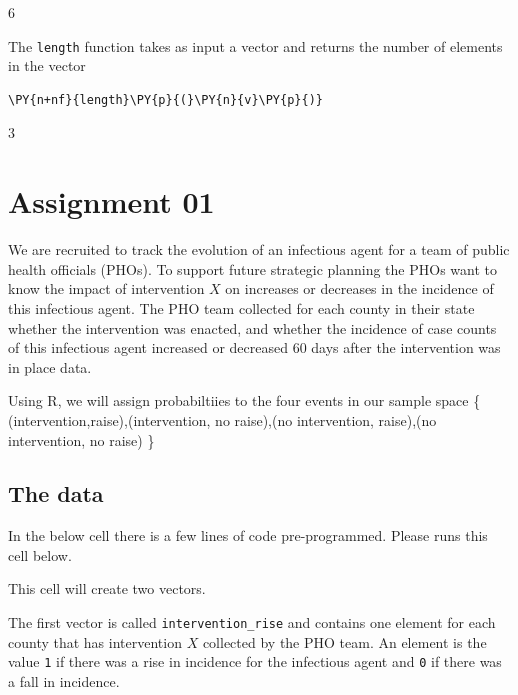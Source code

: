     6

    
    The \texttt{length} function takes as input a vector and returns the
number of elements in the vector

    \begin{tcolorbox}[breakable, size=fbox, boxrule=1pt, pad at break*=1mm,colback=cellbackground, colframe=cellborder]
\begin{Verbatim}[commandchars=\\\{\}]
\PY{n+nf}{length}\PY{p}{(}\PY{n}{v}\PY{p}{)}
\end{Verbatim}
\end{tcolorbox}

    3

    
    \hypertarget{assignment-01}{%
\section{Assignment 01}\label{assignment-01}}

We are recruited to track the evolution of an infectious agent for a
team of public health officials (PHOs). To support future strategic
planning the PHOs want to know the impact of intervention \(X\) on
increases or decreases in the incidence of this infectious agent. The
PHO team collected for each county in their state whether the
intervention was enacted, and whether the incidence of case counts of
this infectious agent increased or decreased 60 days after the
intervention was in place data.

Using R, we will assign probabiltiies to the four events in our sample
space \{ (intervention,raise),(intervention, no raise),(no intervention,
raise),(no intervention, no raise) \}

\hypertarget{the-data}{%
\subsection{The data}\label{the-data}}

In the below cell there is a few lines of code pre-programmed. Please
runs this cell below.

This cell will create two vectors.

The first vector is called \texttt{intervention\_rise} and contains one
element for each county that has intervention \(X\) collected by the PHO
team. An element is the value \texttt{1} if there was a rise in
incidence for the infectious agent and \texttt{0} if there was a fall in
incidence.

